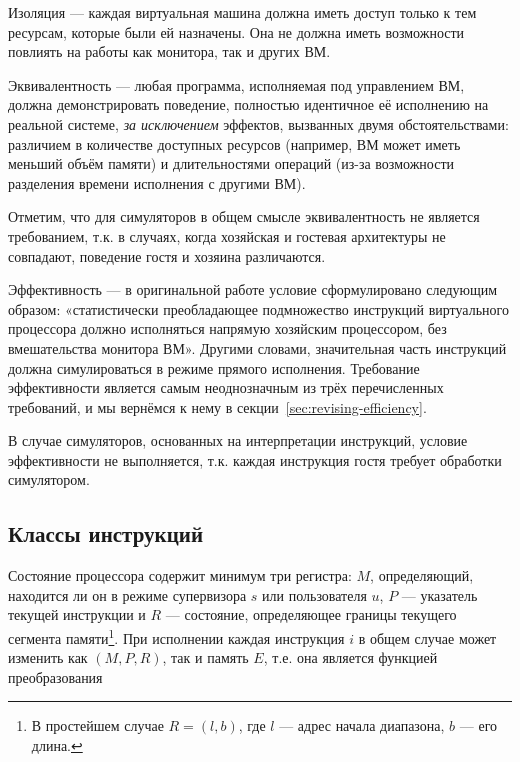 \begin{description*}

\item[Изоляция] --- каждая виртуальная машина должна иметь доступ только к тем ресурсам, которые были ей назначены. Она не должна иметь возможности повлиять на работы как монитора, так и других ВМ.

\item[Эквивалентность] --- любая программа, исполняемая под управлением ВМ, должна демонстрировать поведение, полностью идентичное её исполнению на реальной системе, \emph{за исключением} эффектов, вызванных двумя обстоятельствами: различием в количестве доступных ресурсов (например, ВМ может иметь меньший объём памяти) и длительностями операций (из-за возможности разделения времени исполнения с другими ВМ).

Отметим, что для симуляторов в общем смысле эквивалентность не является требованием, т.к. в случаях, когда хозяйская и гостевая архитектуры не совпадают, поведение гостя и хозяина различаются.

\item[Эффективность] --- в оригинальной работе условие сформулировано следующим образом: «статистически преобладающее подмножество инструкций виртуального процессора должно исполняться напрямую хозяйским процессором, без вмешательства монитора ВМ». Другими словами, значительная часть инструкций должна симулироваться в режиме прямого исполнения. Требование эффективности является самым неоднозначным из трёх перечисленных требований, и мы вернёмся к нему в секции~\ref{sec:revising-efficiency}.

В случае симуляторов, основанных на интерпретации инструкций, условие эффективности не выполняется, т.к. каждая инструкция гостя требует обработки симулятором.

\end{description*}

\subsection{Классы инструкций}

Состояние процессора содержит минимум три регистра: $M$, определяющий, находится ли он в режиме супервизора $s$ или пользователя $u$, $P$ --- указатель текущей инструкции и $R$ --- состояние, определяющее границы текущего сегмента памяти\footnote{В простейшем случае $R=(l,b)$, где $l$ --- адрес начала диапазона, $b$ --- его длина.}. При исполнении каждая инструкция $i$ в общем случае может изменить как $(M,P,R)$, так и память $E$, т.е. она является функцией преобразования 

